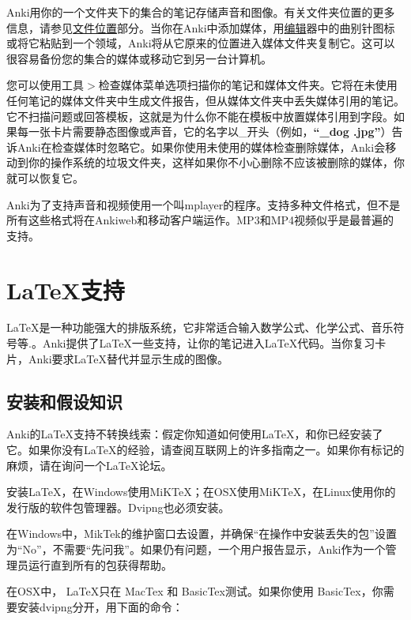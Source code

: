\documentclass[a4paper]{book}
\begin{document}
		Anki用你的一个文件夹下的集合的笔记存储声音和图像。有关文件夹位置的更多信息，请参见\hyperref[files]{文件位置}部分。当你在Anki中添加媒体，用\hyperref[editor]{编辑}器中的曲别针图标或将它粘贴到一个领域，Anki将从它原来的位置进入媒体文件夹复制它。这可以很容易备份您的集合的媒体或移动它到另一台计算机。
			
			您可以使用工具$>$检查媒体菜单选项扫描你的笔记和媒体文件夹。它将在未使用任何笔记的媒体文件夹中生成文件报告，但从媒体文件夹中丢失媒体引用的笔记。它不扫描问题或回答模板，这就是为什么你不能在模板中放置媒体引用到字段。如果每一张卡片需要静态图像或声音，它的名字以\_开头（例如，\textbf{“\_dog .jpg”}）告诉Anki在检查媒体时忽略它。如果你使用未使用的媒体检查删除媒体，Anki会移动到你的操作系统的垃圾文件夹，这样如果你不小心删除不应该被删除的媒体，你就可以恢复它。
			
			Anki为了支持声音和视频使用一个叫mplayer的程序。支持多种文件格式，但不是所有这些格式将在Ankiweb和移动客户端运作。MP3和MP4视频似乎是最普遍的支持。
			
			\chapter{LaTeX支持}
			
			LaTeX是一种功能强大的排版系统，它非常适合输入数学公式、化学公式、音乐符号等.。Anki提供了LaTeX一些支持，让你的笔记进入\LaTeX 代码。当你复习卡片，Anki要求\LaTeX 替代并显示生成的图像。
			
			\section{安装和假设知识}
			
			Anki的LaTeX支持不转换线索：假定你知道如何使用\LaTeX ，和你已经安装了它。如果你没有LaTeX的经验，请查阅互联网上的许多指南之一。如果你有标记的麻烦，请在询问一个LaTeX论坛。
			
			安装LaTeX，在Windows使用MiKTeX；在OSX使用MiKTeX，在Linux使用你的发行版的软件包管理器。Dvipng也必须安装。
			
			
			\begin{shaded}
				在Windows中，MikTek的维护窗口去设置，并确保“在操作中安装丢失的包”设置为“No”，不需要“先问我”。如果仍有问题，一个用户报告显示，Anki作为一个管理员运行直到所有的包获得帮助。
			\end{shaded}
			
			\begin{shaded}
				在OSX中， LaTeX只在 MacTex 和 BasicTex测试。如果你使用 BasicTex，你需要安装dvipng分开，用下面的命令：
			\end{shaded}
			
\end{document}
